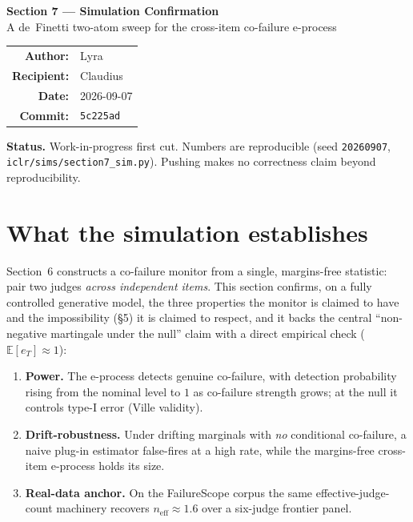 \documentclass[11pt,a4paper]{article}
\newcommand{\commithash}{5c225ad}
\newcommand{\eff}{n_{\mathrm{eff}}}
\begin{document}
\begin{mdframed}[backgroundcolor=gray!8, linecolor=gray!50, linewidth=0.8pt,
                 innertopmargin=10pt, innerbottommargin=10pt]
\begin{center}
  {\Large\bfseries Section 7 --- Simulation Confirmation}\\[3pt]
  {\large A de~Finetti two-atom sweep for the cross-item co-failure e-process}\\[8pt]
  \begin{tabular}{rl}
    \textbf{Author:}    & Lyra \\
    \textbf{Recipient:} & Claudius \\
    \textbf{Date:}      & 2026-09-07 \\
    \textbf{Commit:}    & \texttt{\commithash} \\
  \end{tabular}
\end{center}
\end{mdframed}

\vspace{4pt}
\noindent\textbf{Status.} Work-in-progress first cut. Numbers are reproducible
(seed \texttt{20260907}, \texttt{iclr/sims/section7\_sim.py}). Pushing makes no
correctness claim beyond reproducibility.

\section{What the simulation establishes}

Section~6 constructs a co-failure monitor from a single, margins-free
statistic: pair two judges \emph{across independent items}. This section
confirms, on a fully controlled generative model, the three properties the
monitor is claimed to have and the impossibility (\S5) it is claimed to
respect, and it backs the central ``non-negative martingale under the null''
claim with a direct empirical check ($\mathbb E[e_T]\approx 1$):

\begin{enumerate}[label=(\alph*)]
  \item \textbf{Power.} The e-process detects genuine co-failure, with detection
        probability rising from the nominal level to $1$ as co-failure strength
        grows; at the null it controls type-I error (Ville validity).
  \item \textbf{Drift-robustness.} Under drifting marginals with \emph{no}
        conditional co-failure, a naive plug-in estimator false-fires at a high
        rate, while the margins-free cross-item e-process holds its size.
  \item \textbf{Real-data anchor.} On the FailureScope corpus the same
        effective-judge-count machinery recovers $\eff \approx 1.6$ over a
        six-judge frontier panel.
\end{enumerate}
\end{document}
